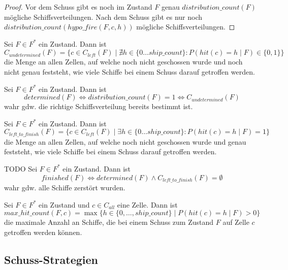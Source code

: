 \documentclass[a4paper,12pt]{llncs}
\numberwithin{equation}{section}
\begin{document}
\begin{proof}
Vor dem Schuss gibt es noch im Zustand $F$ genau $distribution\_count(F)$ mögliche Schiffsverteilungen.
Nach dem Schuss gibt es nur noch \\$distribution\_count(hypo\_fire(F,c, h))$ mögliche Schiffsverteilungen.
\end{proof}


\begin{definition}
Sei $F\in F^*$ ein Zustand.
Dann ist
\[
C_{undetermined}(F)=\{ c \in C_{left}(F) \mid \nexists h \in \{0 \dots ship\_count\} \colon P(hit(c)=h \mid F) \in \{0, 1\}\}
\]
die Menge an allen Zellen, auf welche noch nicht geschossen wurde und noch nicht genau feststeht, wie viele Schiffe bei einem Schuss darauf getroffen werden.
\end{definition}

\begin{definition}
Sei $F\in F^*$ ein Zustand.
Dann ist
\[
determined(F) \Leftrightarrow distribution\_count(F)=1 \Leftrightarrow C_{undetermined}(F)
\]
wahr gdw. die richtige Schiffsverteilung bereits bestimmt ist.
\end{definition}


\begin{definition}
Sei $F\in F^*$ ein Zustand.
Dann ist
\[
C_{left\_to\_finish}(F)=\{ c \in C_{left}(F) \mid \exists h \in \{0 \dots ship\_count\} \colon P(hit(c)=h \mid F) = 1\}
\]
die Menge an allen Zellen, auf welche noch nicht geschossen wurde und genau feststeht, wie viele Schiffe bei einem Schuss darauf getroffen werden.
\end{definition}

\begin{definition}
TODO
Sei $F\in F^*$ ein Zustand.
Dann ist
\[
finished(F) \Leftrightarrow determined(F) \land C_{left\_to\_finish}(F) = \emptyset
\]
wahr gdw. alle Schiffe zerstört wurden.
\end{definition}

\begin{definition}
Sei $F\in F^*$ ein Zustand und $c \in C_{all}$ eine Zelle.
Dann ist
\[
max\_hit\_count(F, c)=\max \{h \in \{0, \dots, ship\_count\} \mid P(hit(c) = h \mid F) > 0\}
\]
die maximale Anzahl an Schiffe, die bei einem Schuss zum Zustand $F$ auf Zelle $c$ getroffen werden können.
\end{definition}

\subsection{Schuss-Strategien}
\end{document}

